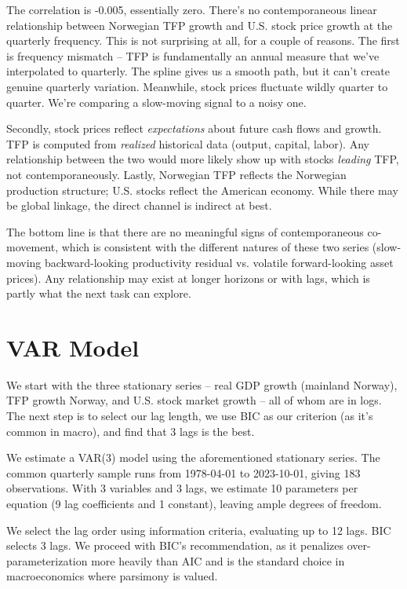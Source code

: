 \documentclass[10pt]{article}
\begin{document}
The correlation is -0.005, essentially zero. There's no contemporaneous linear relationship between Norwegian TFP growth and U.S. stock price growth at the quarterly frequency. This is not surprising at all, for a couple of reasons. The first is frequency mismatch -- TFP is fundamentally an annual measure that we've interpolated to quarterly. The spline gives us a smooth path, but it can't create genuine quarterly variation. Meanwhile, stock prices fluctuate wildly quarter to quarter. We're comparing a slow-moving signal to a noisy one. 

Secondly, stock prices reflect \textit{expectations} about future cash flows and growth. TFP is computed from \textit{realized} historical data (output, capital, labor). Any relationship between the two would more likely show up with stocks \textit{leading} TFP, not contemporaneously. Lastly, Norwegian TFP reflects the Norwegian production structure; U.S. stocks reflect the American economy. While there may be global linkage, the direct channel is indirect at best. 

The bottom line is that there are no meaningful signs of contemporaneous co-movement, which is consistent with the different natures of these two series (slow-moving backward-looking productivity residual vs. volatile forward-looking asset prices). Any relationship may exist at longer horizons or with lags, which is partly what the next task can explore. 
\newpage 
\section{VAR Model}
We start with the three stationary series -- real GDP growth (mainland Norway), TFP growth Norway, and U.S. stock market growth -- all of whom are in logs. The next step is to select our lag length, we use BIC as our criterion (as it's common in macro), and find that 3 lags is the best. 

We estimate a VAR(3) model using the aforementioned stationary series. The common quarterly sample runs from 1978-04-01 to 2023-10-01, giving 183 observations. With 3 variables and 3 lags, we estimate 10 parameters per equation (9 lag coefficients and 1 constant), leaving ample degrees of freedom. 

We select the lag order using information criteria, evaluating up to 12 lags. BIC selects 3 lags. We proceed with BIC's recommendation, as it penalizes over-parameterization more heavily than AIC and is the standard choice in macroeconomics where parsimony is valued. 
\end{document}
